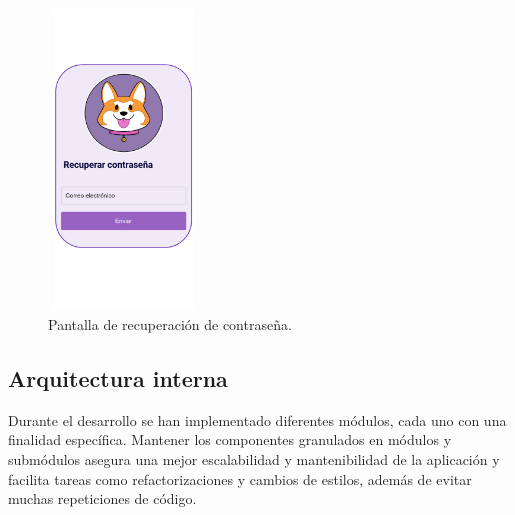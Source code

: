 \documentclass[a4paper, 12pt]{article}
\begin{document}
\begin{figure}[H]
   	\begin{minipage}{0.48\textwidth}
		\begin{center}
			{\includegraphics[height=8cm, width=4cm]{design/PasswordRecovery.jpg}\par}
			\caption{Pantalla de recuperación de contraseña.}
			\medskip
		\end{center}  
	\end{minipage}\hfill
\end{figure}


\subsection{Arquitectura interna}

Durante el desarrollo se han implementado diferentes módulos, cada uno con una finalidad específica. Mantener los componentes granulados en módulos y submódulos asegura una mejor escalabilidad y mantenibilidad de la aplicación y facilita tareas como refactorizaciones y cambios de estilos, además de evitar muchas repeticiones de código.
\end{document}
